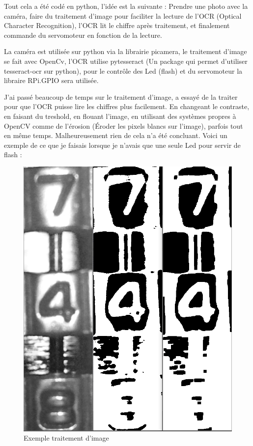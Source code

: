 \documentclass[twoside]{article}
\begin{document}
\begin{multicols}{2}
Tout cela a été codé en python, l'idée est la suivante : Prendre une photo avec la caméra, faire du traitement d'image pour faciliter la lecture de l'OCR (Optical Character Recognition), l'OCR lit le chiffre après traitement, et finalement commande du servomoteur en fonction de la lecture.

La caméra est utilisée sur python via la librairie picamera, le traitement d'image se fait avec OpenCv, l'OCR utilise pytesseract (Un package qui permet d'utiliser tesseract-ocr sur python), pour le contrôle des Led (flash) et du servomoteur la libraire RPi.GPIO sera utilisée.

J'ai passé beaucoup de temps sur le traitement d'image, a essayé de la traiter pour que l'OCR puisse lire les chiffres plus facilement. En changeant le contraste, en faisant du treshold, en flouant l'image, en utilisant des systèmes propres à OpenCV comme de l'érosion (Éroder les pixels blancs sur l'image), parfois tout en même temps. Malheureusement rien de cela n'a été concluant. Voici un exemple de ce que je faisais lorsque je n'avais que une seule Led pour servir de flash : 

\begin{figure}[H]
\centering
\includegraphics[scale=0.3]{TraitementImage.png}
\caption{Exemple traitement d'image}
\end{figure}


\end{multicols}
\end{document}
